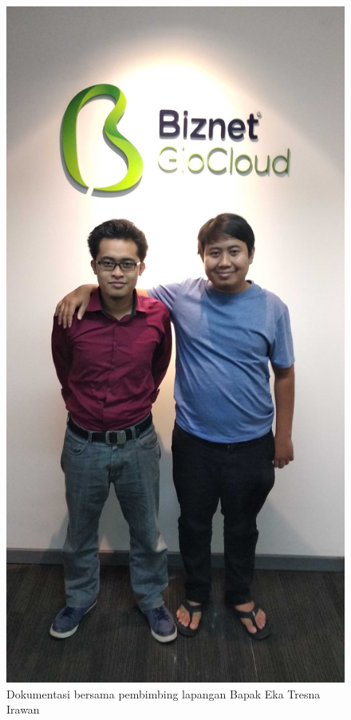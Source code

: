 
\renewcommand\thefigure{\thesection.\arabic{figure}}


\setcounter{figure}{0}



\begin{figure}[tph]
  \centering
  \includegraphics[width=.9\linewidth]{img/dok1-50p}
  \caption{Dokumentasi bersama pembimbing lapangan Bapak Eka Tresna Irawan}
\end{figure}

